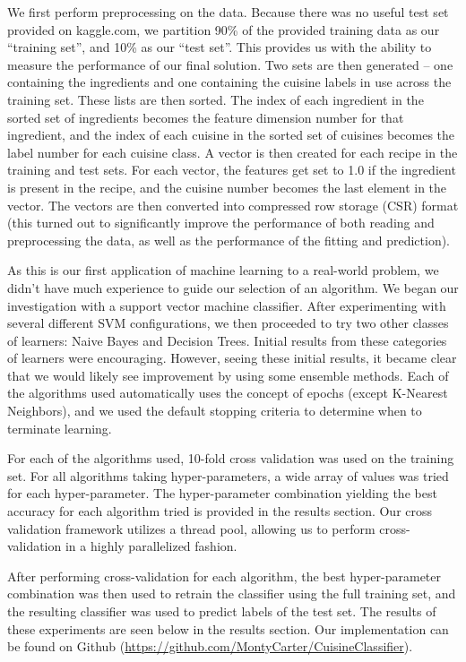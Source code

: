 \documentclass[11pt]{article}
\begin{document}
We first perform preprocessing on the data.  Because there was no
useful test set provided on kaggle.com, we partition 90\% of the
provided training data as our ``training set'', and 10\% as our ``test
set''. This provides us with the ability to measure the performance of
our final solution.  Two sets are then generated -- one containing the
ingredients and one containing the cuisine labels in use across the
training set.  These lists are then sorted.  The index of each
ingredient in the sorted set of ingredients becomes the feature 
dimension number for that ingredient, and the index of each cuisine in
the sorted set of cuisines becomes the label number for each cuisine
class.  A vector is then created for each recipe in the training and
test sets.  For each vector, the features get set to 1.0 if the
ingredient is present in the recipe, and the cuisine number becomes
the last element in the vector.  The vectors are then converted into
compressed row storage (CSR) format (this turned out to significantly
improve the performance of both reading and preprocessing the data, as 
well as the performance of the fitting and prediction).

As this is our first application of machine learning to a real-world
problem, we didn't have much experience to guide our selection of an
algorithm.  We began our investigation with a support vector machine
classifier.  After experimenting with several different SVM
configurations, we then proceeded to try two other classes of
learners: Naive Bayes and Decision Trees.  Initial results from these
categories of learners were encouraging.  However, seeing these
initial results, it became clear that we would likely see improvement
by using some ensemble methods.  Each of the algorithms used
automatically uses the concept of epochs (except K-Nearest Neighbors),
and we used the default stopping criteria to determine when to
terminate learning.  

For each of the algorithms used, 10-fold cross validation was used on
the training set.  For all algorithms taking hyper-parameters, a wide
array of values was tried for each hyper-parameter.  The
hyper-parameter combination yielding the best accuracy for each
algorithm tried is provided in the results section.  Our cross
validation framework utilizes a thread pool, allowing us to perform
cross-validation in a highly parallelized fashion.

After performing cross-validation for each algorithm, the best
hyper-parameter combination was then used to retrain the classifier
using the full training set, and the resulting classifier was used
to predict labels of the test set.  The results of these experiments
are seen below in the results section. Our implementation can be found
on Github (\url{https://github.com/MontyCarter/CuisineClassifier}).
\end{document}
